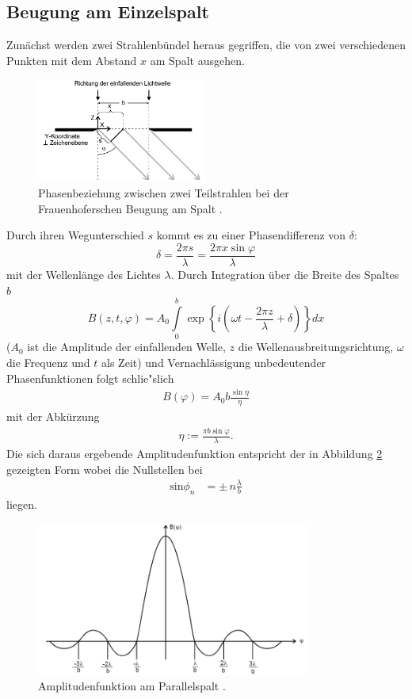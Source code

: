 \subsection{Beugung am Einzelspalt}
Zunächst werden zwei Strahlenbündel heraus gegriffen, die von zwei verschiedenen Punkten mit dem Abstand $x$ am Spalt ausgehen.
\begin{figure}[H]
    \centering
    \includegraphics[width=0.5\textwidth]{einzel.png}
    \caption{Phasenbeziehung zwischen zwei Teilstrahlen bei der Frauenhoferschen Beugung am Spalt \cite{1}.}
    \label{fig:einzel}
\end{figure}
\noindent
 Durch ihren Wegunterschied $s$ kommt es zu einer Phasendifferenz von $\delta$:
\begin{equation}
\delta = \frac{2\pi s}{\lambda} = \frac{2 \pi x \sin\varphi}{\lambda}
\end{equation}
mit der Wellenlänge des Lichtes $\lambda$. Durch Integration über die Breite des Spaltes $b$ 
\begin{equation}
B(z,t,\varphi) = A_0 \int\limits_0^b \exp\left\{i\left(\omega t - \frac{2 \pi z}{\lambda} + \delta\right)\right\}dx
\end{equation}
($A_0$ ist die Amplitude der einfallenden Welle, $z$ die Wellenausbreitungsrichtung, $\omega$ die Frequenz und $t$ als Zeit) 
und Vernachlässigung unbedeutender Phasenfunktionen folgt schlie"slich 
\begin{align}
B(\varphi) = A_0b\frac{\sin\eta}{\eta}
\end{align}
mit der Abkürzung
\begin{align}
\eta := \frac{\pi b \sin\varphi}{\lambda}.
\end{align}
Die sich daraus ergebende Amplitudenfunktion entspricht der in Abbildung
\ref{fig:Amplitude} gezeigten Form wobei die Nullstellen bei
\begin{align}
    \text{sin} \phi_n &= \pm\, n \frac{\lambda}{b}
\end{align}
liegen.
\begin{figure}[H]
    \centering
    \includegraphics[width=0.8\textwidth]{Amplitude.png}
    \caption{Amplitudenfunktion am Parallelspalt \cite{1}.}
    \label{fig:Amplitude}
\end{figure}
